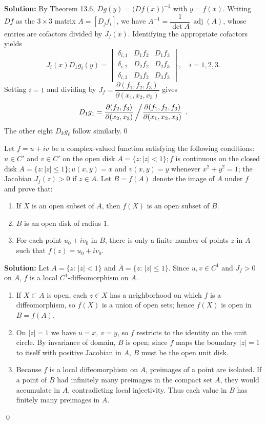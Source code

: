 \bigskip\noindent\textbf{Solution:}
By Theorem 13.6, $Dg(y)=\big(Df(x)\big)^{-1}$ with $y=f(x)$. Writing $Df$ as the $3\times3$ matrix $A=[D_j f_i]$, we have $A^{-1}=\dfrac{1}{\det A}\,\operatorname{adj}(A)$, whose entries are cofactors divided by $J_f(x)$. Identifying the appropriate cofactors yields
\[J_i(x)D_1g_i(y)=\begin{vmatrix}
\delta_{i,1} & D_1f_2 & D_1f_3\\
\delta_{i,2} & D_2f_2 & D_2f_3\\
\delta_{i,3} & D_3f_2 & D_3f_3
\end{vmatrix},\quad i=1,2,3.
\]
Setting $i=1$ and dividing by $J_f=\dfrac{\partial(f_1,f_2,f_3)}{\partial(x_1,x_2,x_3)}$ gives
\[D_1g_1=\frac{\partial(f_2,f_3)}{\partial(x_2,x_3)}\left/\frac{\partial(f_1,f_2,f_3)}{\partial(x_1,x_2,x_3)}\right.\,.
\]
The other eight $D_k g_\ell$ follow similarly.\qed


\begin{problembox}
Let \( f = u + iv \) be a complex-valued function satisfying the following conditions: \( u \in C' \) and \( v \in C' \) on the open disk \( A = \{z : |z| < 1\}; f \) is continuous on the closed disk \( \bar{A} = \{z : |z| \leq 1\}; u(x, y) = x \) and \( v(x, y) = y \) whenever \( x^2 + y^2 = 1 \); the Jacobian \( J_f(z) > 0 \) if \( z \in A \). Let \( B = f(A) \) denote the image of \( A \) under \( f \) and prove that:
\begin{enumerate}[label=(\alph*)]
    \item If \( X \) is an open subset of \( A \), then \( f(X) \) is an open subset of \( B \).
    \item \( B \) is an open disk of radius 1.
    \item For each point \( u_0 + iv_0 \) in \( B \), there is only a finite number of points \( z \) in \( A \) such that \( f(z) = u_0 + iv_0 \).
\end{enumerate}
\end{problembox}

\bigskip\noindent\textbf{Solution:}
Let $A=\{z:\,|z|<1\}$ and $\bar A=\{z:\,|z|\le 1\}$. Since $u,v\in C^1$ and $J_f>0$ on $A$, $f$ is a local $C^1$-diffeomorphism on $A$.
\begin{enumerate}[label=(\alph*)]
    \item If $X\subset A$ is open, each $z\in X$ has a neighborhood on which $f$ is a diffeomorphism, so $f(X)$ is a union of open sets; hence $f(X)$ is open in $B=f(A)$.
    \item On $|z|=1$ we have $u=x,\ v=y$, so $f$ restricts to the identity on the unit circle. By invariance of domain, $B$ is open; since $f$ maps the boundary $|z|=1$ to itself with positive Jacobian in $A$, $B$ must be the open unit disk.
    \item Because $f$ is a local diffeomorphism on $A$, preimages of a point are isolated. If a point of $B$ had infinitely many preimages in the compact set $\bar A$, they would accumulate in $A$, contradicting local injectivity. Thus each value in $B$ has finitely many preimages in $A$.
\end{enumerate}\qed
